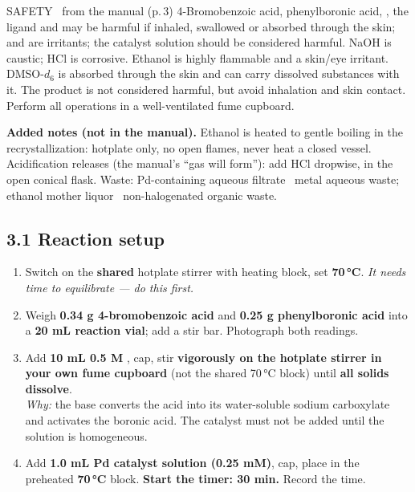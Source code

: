 \documentclass[10pt,a4paper]{article}
\begin{document}
\begin{callout}{SAFETY \textemdash\ from the manual (p.\,3)}
4-Bromobenzoic acid, phenylboronic acid, , the ligand and  may be harmful if inhaled, swallowed or absorbed through the skin;  and  are irritants; the catalyst solution should be considered harmful. NaOH is caustic; HCl is corrosive. Ethanol is highly flammable and a skin/eye irritant. DMSO-$d_6$ is absorbed through the skin and can carry dissolved substances with it. The product is not considered harmful, but avoid inhalation and skin contact. Perform all operations in a well-ventilated fume cupboard.

\textbf{Added notes (not in the manual).} Ethanol is heated to gentle boiling in the recrystallization: hotplate only, no open flames, never heat a closed vessel. Acidification releases  (the manual's ``gas will form''): add HCl dropwise, in the open conical flask. Waste: Pd-containing aqueous filtrate \textrightarrow\ metal aqueous waste; ethanol mother liquor \textrightarrow\ non-halogenated organic waste. 
\end{callout}

\newpage
{}

\subsection*{3.1 Reaction setup}
\begin{enumerate}[leftmargin=7mm,itemsep=1.2mm,label=\cbox\ \arabic*.]
\item Switch on the \textbf{shared} hotplate stirrer with heating block, set \textbf{70\,\si{\celsius}}. \emph{It needs time to equilibrate --- do this first.}
\item Weigh \textbf{0.34 g 4-bromobenzoic acid} and \textbf{0.25 g phenylboronic acid} into a \textbf{20 mL reaction vial}; add a stir bar. Photograph both readings.
\item Add \textbf{10 mL 0.5 M }, cap, stir \textbf{vigorously on the hotplate stirrer in your own fume cupboard} (not the shared 70\,\si{\celsius} block) until \textbf{all solids dissolve}.\\
{\footnotesize \emph{Why:} the base converts the acid into its water-soluble sodium carboxylate and activates the boronic acid. The catalyst must not be added until the solution is homogeneous.}
\item Add \textbf{1.0 mL Pd catalyst solution (0.25 mM)}, cap, place in the preheated \textbf{70\,\si{\celsius}} block. \textbf{Start the timer: 30 min.} Record the time.
\end{enumerate}
\end{document}
